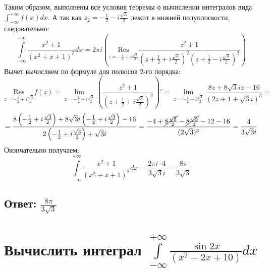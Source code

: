 \documentclass{article}
\begin{document}
	Таким образом, выполнены все условия теоремы о вычислении интегралов вида $\int_{-\infty}^{+\infty}f(x)dx$. А так как $z_2 = -\frac{1}{2} - i \frac{\sqrt{3}}{2}$ лежит в нижней полуплоскости, следовательно:
	\[\int\limits_{-\infty}^{+\infty} \frac{x^2+1}{\left(x^2 + x + 1\right)^2}dx = 2\pi i \left(\underset{z=-\frac{1}{2} + i\frac{\sqrt{3}}{2}}{\text{Res}}\frac{z^2 + 1}{\left(z+\frac{1}{2} + i\frac{\sqrt{3}}{2}\right)^2 \left(z+\frac{1}{2} - i\frac{\sqrt{3}}{2}\right)^2}\right)\]
	Вычет вычисляем по формуле для полюсов 2-го порядка:
	\[\underset{z=-\frac{1}{2} + i\frac{\sqrt{3}}{2}}{\text{Res}} f(z) = \lim\limits_{z=-\frac{1}{2} + i\frac{\sqrt{3}}{2}} \left(\frac{z^2+1}{\left(z + \frac{1}{2} + i\frac{\sqrt{3}}{2}\right)^2}\right)' = \lim\limits_{z=-\frac{1}{2} + i\frac{\sqrt{3}}{2}} \frac{8z+8\sqrt{3}iz - 16}{(2z+1+\sqrt{3}i)^3} =\]
	\[= \frac{8\left(-\frac{1}{2} + i\frac{\sqrt{3}}{2}\right) + 8\sqrt{3}i\left(-\frac{1}{2} + i\frac{\sqrt{3}}{2}\right) - 16}{2\left(-\frac{1}{2} + i\frac{\sqrt{3}}{2}\right) + \sqrt{3}i} = \frac{-4  + \cancel{8\frac{\sqrt{3}}{2}} -  \cancel{8\frac{\sqrt{3}}{2}} - 12 - 16}{(2\sqrt{3})^3} = \frac{4}{3\sqrt{3}i}\]
	Окончательно получаем:
	\[\int\limits_{-\infty}^{+\infty} \frac{x^2+1}{\left(x^2 + x + 1\right)^2}dx = \frac{2\pi i \cdot 4}{3\sqrt{3}i} = \frac{8\pi}{3\sqrt{3}}\]
	\subsection{Ответ: $\frac{8\pi}{3\sqrt{3}}$}
	
	\newpage
	\section{Вычислить интеграл $\int\limits_{-\infty}^{+\infty} \frac{\sin 2x}{\left(x^2 - 2x + 10\right)}dx$}
\end{document}
